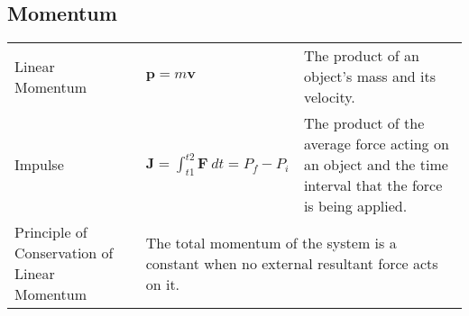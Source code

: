 \documentclass[a4paper]{article}
\begin{document}
		\subsection{Momentum}
			\begin{center}
				\renewcommand{\arraystretch}{1.2}
				\begin{tabular}{@{} p{2.7cm} l p{6.8cm} @{}}
					\toprule
					Linear Momentum & $\textbf{p}=m\textbf{v}$ & The product of an object's mass and its velocity. \\
					\rule{0pt}{20pt}Impulse & $\displaystyle \textbf{J}=\int_{t1}^{t2}\textbf{F}~dt=P_{f}-P_{i}$	& The product of the average force acting on an object and the time interval that the force is being applied.\\	
					\midrule
					Principle of Conservation of Linear Momentum & \multicolumn{2}{p{10.7cm}}{The total momentum of the system is a constant when no external resultant force acts on it.}\\
					\bottomrule
				\end{tabular}
			\end{center}
	\newpage
\end{document}
